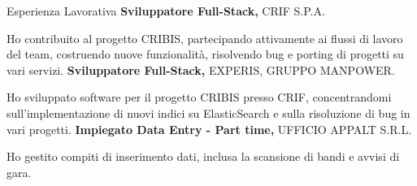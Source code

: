 \begin{rubric}{Esperienza Lavorativa}
%
    \textbf{Sviluppatore Full-Stack,} CRIF S.P.A.
    \par Ho contribuito al progetto CRIBIS, partecipando attivamente ai flussi di lavoro del team, costruendo nuove funzionalità, risolvendo bug e porting di progetti su vari servizi.
%
%
    \textbf{Sviluppatore Full-Stack,} EXPERIS, GRUPPO MANPOWER.
    \par Ho sviluppato software per il progetto CRIBIS presso CRIF, concentrandomi sull'implementazione di nuovi indici su ElasticSearch e sulla risoluzione di bug in vari progetti.
%
%
    \textbf{Impiegato Data Entry - Part time,} UFFICIO APPALT S.R.L.
    \par Ho gestito compiti di inserimento dati, inclusa la scansione di bandi e avvisi di gara.
%
\end{rubric}